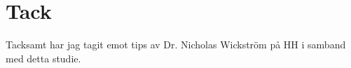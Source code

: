 \documentclass{article}
\begin{document}
\section*{Tack}
Tacksamt har jag tagit emot tips av Dr. Nicholas Wickström på HH i
samband med detta studie.


\newpage



\newpage


\newcommand{\Qq}[1]{\textbf{#1}}

\newcommand{\QO}{$\Box$}%

\newcommand{\Qrating}[1]{\QO\forloop{qr}{1}{\value{qr} < #1}{---\QO}}

\newcommand{\Qline}[1]{\noindent\rule{#1}{0.6pt}}

\newcommand{\Qlines}[1]{\forloop{ql}{0}{\value{ql}<#1}{\vskip0em\Qline{\linewidth}}}

\newenvironment{Qlist}{%
\renewcommand{\labelitemi}{\QO}
\begin{itemize}[leftmargin=1.5em,topsep=-.5em]
}{%
\end{itemize}
}

\newlength{\qt}
\newcommand{\Qtab}[2]{
\setlength{\qt}{\linewidth}
\addtolength{\qt}{-#1}
\hfill\parbox[t]{\qt}{\raggedright #2}
}
\end{document}
